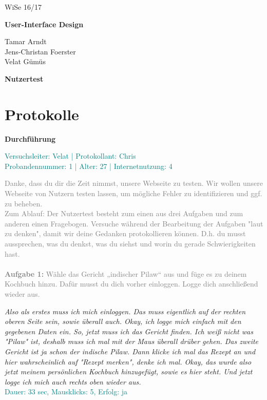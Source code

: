 \documentclass[parskip,10pt,abstracton]{scrartcl}
\renewcommand*{\maketitle}{%
	\begin{flushright}
	{\rmfamily WiSe 16/17 \par}
	\end{flushright}
	\vspace{-1.3cm}
	
	{\bfseries\sffamily User-Interface Design} \\
	{\rmfamily Tamar Arndt \\ Jens-Christan Foerster \\ Velat Gümüs \par}
	
	{\centering\LARGE\sffamily\bfseries Nutzertest \par}
	\vspace{1em}
}
\begin{document}
\maketitle



\section*{Protokolle} 
\textbf{Durchführung}\\
\begin{appendix}
\textcolor{teal}{Versuchsleiter: Velat | Protokollant: Chris}\\
\textcolor{teal}{Probandennummer: 1 | Alter: 27 | Internetnutzung: 4}

\textcolor{gray}{
Danke, dass du dir die Zeit nimmst, unsere Webseite zu testen. 
Wir wollen unsere Webseite von Nutzern testen lassen, um mögliche Fehler zu identifizieren und ggf. zu beheben. \\
Zum Ablauf: Der Nutzertest besteht zum einen aus drei Aufgaben und zum anderen einen Fragebogen. Versuche während der Bearbeitung der Aufgaben "laut zu denken", damit wir deine Gedanken protokollieren können. D.h. du musst aussprechen, was du denkst, was du siehst und worin du gerade Schwierigkeiten hast. 
}\\\\
\textcolor{gray}{
\textbf{Aufgabe 1:} Wähle das Gericht „indischer Pilaw“ aus und füge es zu deinem Kochbuch hinzu. Dafür musst du dich vorher einloggen. Logge dich anschließend wieder aus.}

\textit{Also als erstes muss ich mich einloggen. Das muss eigentlich auf der rechten oberen Seite sein, sowie überall auch. Okay, ich logge mich einfach mit den gegebenen Daten ein. So, jetzt muss ich das Gericht finden. Ich weiß nicht was "Pilaw" ist, deshalb muss ich mal mit der Maus überall drüber gehen. Das zweite Gericht ist ja schon der indische Pilaw. Dann klicke ich mal das Rezept an und hier wahrscheinlich auf "Rezept merken", denke ich mal. Okay, das wurde also jetzt meinem persönlichen Kochbuch hinzugefügt, sowie es hier steht. Und jetzt logge ich mich auch rechts oben wieder aus.}\\
\textcolor{teal}{Dauer: 33 sec, Mausklicks: 5, Erfolg: ja}\\\\


\end{appendix}
\end{document}
